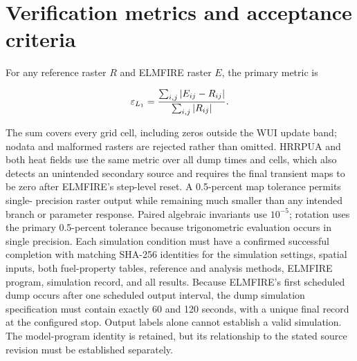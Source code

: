 \section{Verification metrics and acceptance criteria}

For any reference raster $R$ and ELMFIRE raster $E$, the primary metric is

\begin{equation}
 \varepsilon_{L_1}=\frac{\sum_{i,j}|E_{ij}-R_{ij}|}{\sum_{i,j}|R_{ij}|}.
\end{equation}

The sum covers every grid cell, including zeros outside the WUI update band;
nodata and malformed rasters are rejected rather than omitted.  HRRPUA and
both heat fields use the same metric over all dump times and cells, which also
detects an unintended secondary source and requires the final transient maps
to be zero after ELMFIRE's step-level reset.  A 0.5-percent map tolerance permits single-
precision raster output while remaining much smaller than any intended branch
or parameter response.  Paired algebraic invariants use $10^{-5}$; rotation
uses the primary 0.5-percent tolerance because trigonometric evaluation occurs
in single precision. Each simulation condition must have a confirmed successful
completion with matching SHA-256 identities for the simulation settings,
spatial inputs, both fuel-property tables, reference and analysis methods,
ELMFIRE program, simulation record, and all results. Because ELMFIRE's first
scheduled dump occurs after one scheduled output interval, the dump simulation specification
must contain exactly 60 and
120 seconds, with a unique final record at the
configured stop. Output labels alone cannot establish a valid simulation.
The model-program identity is retained, but its relationship to the stated
source revision must be established separately.

